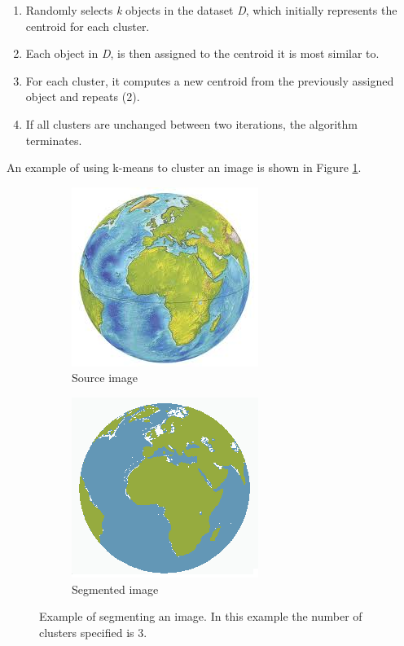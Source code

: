 \begin{enumerate}
  \item Randomly selects \textit{k} objects in the dataset \textit{D}, which initially represents the centroid for each cluster.
  \item Each object in \textit{D}, is then assigned to the centroid it is most similar to.
  \item For each cluster, it computes a new centroid from the previously assigned object and repeats (2).
  \item If all clusters are unchanged between two iterations, the algorithm terminates.
\end{enumerate}

An example of using k-means to cluster an image is shown in Figure \ref{fig:segmentation}. \\

\begin{figure}
        \centering
        \begin{subfigure}[b]{0.3\textwidth}
                \includegraphics[scale = 0.5]{img/earth}
                \caption{Source image}
        \end{subfigure}
		\quad
        \begin{subfigure}[b]{0.3\textwidth}
                \includegraphics[scale = 0.5]{img/earth_segment}
                \caption{Segmented image}
        \end{subfigure}
		\caption{Example of segmenting an image. In this example the number of clusters specified is 3.}
		\label{fig:segmentation}
\end{figure}

